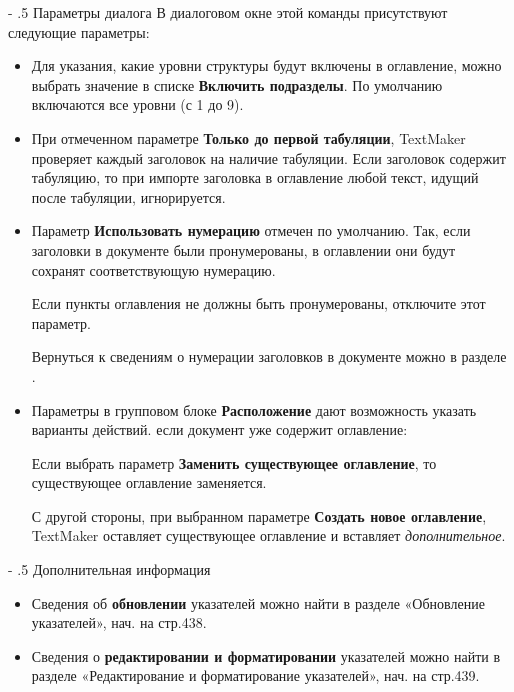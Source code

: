 ﻿\documentclass[a4paper,10pt]{article}
\makeatletter
\renewcommand\paragraph{%
   \@startsection{paragraph}{4}{0mm}%
      {-\baselineskip}%
      {.5\baselineskip}%
      {\normalfont\normalsize\bfseries}}
\makeatother
\begin{document}
\paragraph{Параметры диалога}
В диалоговом окне этой команды присутствуют следующие параметры:

\begin{itemize}
 \item Для указания, какие уровни структуры будут включены в оглавление, можно выбрать значение в списке \textbf{Включить подразделы}. По умолчанию включаются все уровни (с 1 до 9).
 \item При отмеченном параметре \textbf{Только до первой табуляции}, TextMaker проверяет каждый заголовок на наличие табуляции. Если заголовок содержит табуляцию, то при импорте заголовка в оглавление любой текст, идущий после табуляции, игнорируется.
 \item Параметр \textbf{Использовать нумерацию} отмечен по умолчанию. Так, если заголовки в документе были пронумерованы, в оглавлении они будут сохранят соответствующую нумерацию.
 
Если пункты оглавления не должны быть пронумерованы, отключите этот параметр. 

Вернуться к сведениям о нумерации заголовков в документе можно в разделе .
\item Параметры в групповом блоке \textbf{Расположение} дают возможность указать варианты действий. если документ уже содержит оглавление:

Если выбрать параметр \textbf{Заменить существующее оглавление}, то существующее оглавление заменяется.

С другой стороны, при выбранном параметре \textbf{Создать новое оглавление}, TextMaker оставляет существующее оглавление и вставляет \textit{дополнительное}.
\end{itemize}

\paragraph{Дополнительная информация}
\begin{itemize}
 \item Сведения об \textbf{обновлении} указателей можно найти в разделе «Обновление указателей», нач. на стр.438.
 \item Сведения о \textbf{редактировании и форматировании} указателей можно найти в разделе «Редактирование и форматирование указателей», нач. на стр.439.
\end{itemize}
\end{document}
